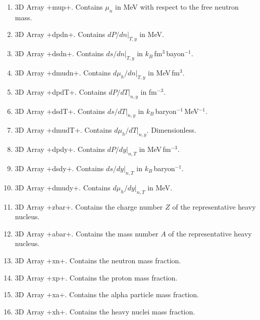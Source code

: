 \documentclass[letterpaper,11pt]{refart}
\begin{document}
\begin{enumerate}
 \item 3D Array \verbprm+mup+. Contains $\mu_n$ in MeV with respect to the
   free neutron mass.

 \item 3D Array \verbprm+dpdn+. Contains $dP/dn\vert_{T,y}$ in MeV.  

 \item 3D Array
   \verbprm+dsdn+. Contains $ds/dn\vert_{T,y}$ in $k_B$\,fm$^3$\,bayon$^{-1}$. 

 \item 3D Array \verbprm+dmudn+. Contains $d\mu_h/dn\vert_{T,y}$ in MeV\,fm$^3$. 

 \item 3D Array \verbprm+dpdT+. Contains $dP/dT\vert_{n,y}$ in fm$^{-3}$.

 \item 3D Array
   \verbprm+dsdT+. Contains $ds/dT\vert_{n,y}$ in $k_B$\,baryon$^{-1}$\,MeV$^{-1}$.

 \item 3D Array
   \verbprm+dmudT+. Contains $d\mu_h/dT\vert_{n,y}$. Dimensionless. 

 \item 3D Array \verbprm+dpdy+. Contains $dP/dy\vert_{n,T}$ in MeV\,fm$^{-3}$.

 \item 3D Array \verbprm+dsdy+. Contains $ds/dy\vert_{n,T}$ in  $k_B$\,baryon$^{-1}$.

 \item 3D Array
   \verbprm+dmudy+. Contains $d\mu_h/dy\vert_{n,T}$ in MeV. 

 \item 3D Array
   \verbprm+zbar+. Contains the charge number $Z$ of the representative
   heavy nucleus.

 \item 3D Array
   \verbprm+abar+. Contains the mass number $A$ of the representative
   heavy nucleus.

 \item 3D Array
   \verbprm+xn+. Contains the neutron mass fraction.

 \item 3D Array \verbprm+xp+. Contains the proton mass fraction.

 \item 3D Array \verbprm+xa+. Contains the alpha particle mass fraction.

 \item 3D Array \verbprm+xh+. Contains the heavy nuclei mass fraction.


\end{enumerate}
\end{document}
